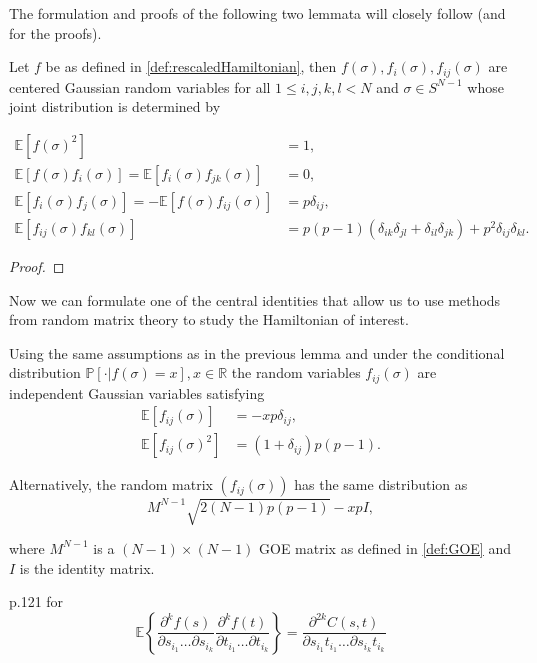 The formulation and proofs of the following two lemmata will closely follow \cite{Cerny10} (and \cite{Adler07} for the proofs).

\begin{lemma}[Covariances of $f$]
	Let $f$ be as defined in \ref{def:rescaledHamiltonian}, then $f(\sigma),f_i(\sigma),f_{ij}(\sigma)$ are centered Gaussian random variables for all $1\leq i,j,k,l<N$ and $\sigma\in S^{N-1}$ whose joint distribution is determined by
	
	\begin{align}\label{eq:covariancesoff}
		\mathbb E[f(\sigma)^2]&=1,\nonumber\\
		\mathbb E[f(\sigma)f_i(\sigma)]=\mathbb E[f_i(\sigma)f_{jk}(\sigma)]&=0,\nonumber\\
		\mathbb E[f_i(\sigma)f_j(\sigma)]=-\mathbb E[f(\sigma)f_{ij}(\sigma)] &= p\delta_{ij},\nonumber\\
		\mathbb E[f_{ij}(\sigma)f_{kl}(\sigma)] &= p(p-1)(\delta_{ik}\delta_{jl}+\delta_{il}\delta_{jk})+p^2\delta_{ij}\delta_{kl}.
	\end{align}
\end{lemma}

\begin{proof}
	
\end{proof}

Now we can formulate one of the central identities that allow us to use methods from random matrix theory to study the Hamiltonian of interest.

\begin{lemma}
	Using the same assumptions as in the previous lemma and under the conditional distribution $\mathbb P[\cdot|f(\sigma)=x], x\in\mathbb R$ the random variables $f_{ij}(\sigma)$ are independent Gaussian variables satisfying
	\begin{align}
		\mathbb E[f_{ij}(\sigma)]&=-xp\delta_{ij},\nonumber\\
		\mathbb E[f_{ij}(\sigma)^2]&=(1+\delta_{ij})p(p-1).
	\end{align}
	
	Alternatively, the random matrix $(f_{ij}(\sigma))$ has the same distribution as $$M^{N-1}\sqrt{2(N-1)p(p-1)}-xpI,$$
	
	where $M^{N-1}$ is a $(N-1)\times(N-1)$ GOE matrix as defined in \ref{def:GOE} and $I$ is the identity matrix.
\end{lemma}


\cite{Adler07} p.121 for \begin{equation}
	\mathbb E\left\{\frac{\partial^k f(s)}{\partial s_{i_1}\dots\partial s_{i_k}} \frac{\partial^k f(t)}{\partial t_{i_1}\dots\partial t_{i_k}}\right\}=\frac{\partial^{2k} C(s,t)}{\partial s_{i_1}t_{i_1}\dots\partial s_{i_k}t_{i_k}}
\end{equation}

